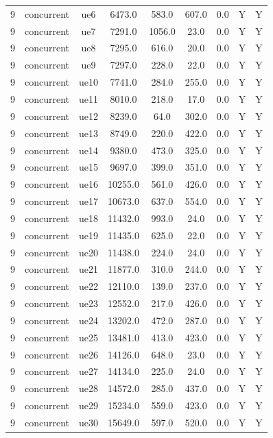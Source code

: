 \begin{table}[ht]
\begin{tabular}{|c|c|c|c|c|c|c|c|c|}
9 & concurrent & ue6 & 6473.0 & 583.0 & 607.0 & 0.0 & Y & Y \\
9 & concurrent & ue7 & 7291.0 & 1056.0 & 23.0 & 0.0 & Y & Y \\
9 & concurrent & ue8 & 7295.0 & 616.0 & 20.0 & 0.0 & Y & Y \\
9 & concurrent & ue9 & 7297.0 & 228.0 & 22.0 & 0.0 & Y & Y \\
9 & concurrent & ue10 & 7741.0 & 284.0 & 255.0 & 0.0 & Y & Y \\
9 & concurrent & ue11 & 8010.0 & 218.0 & 17.0 & 0.0 & Y & Y \\
9 & concurrent & ue12 & 8239.0 & 64.0 & 302.0 & 0.0 & Y & Y \\
9 & concurrent & ue13 & 8749.0 & 220.0 & 422.0 & 0.0 & Y & Y \\
9 & concurrent & ue14 & 9380.0 & 473.0 & 325.0 & 0.0 & Y & Y \\
9 & concurrent & ue15 & 9697.0 & 399.0 & 351.0 & 0.0 & Y & Y \\
9 & concurrent & ue16 & 10255.0 & 561.0 & 426.0 & 0.0 & Y & Y \\
9 & concurrent & ue17 & 10673.0 & 637.0 & 554.0 & 0.0 & Y & Y \\
9 & concurrent & ue18 & 11432.0 & 993.0 & 24.0 & 0.0 & Y & Y \\
9 & concurrent & ue19 & 11435.0 & 625.0 & 22.0 & 0.0 & Y & Y \\
9 & concurrent & ue20 & 11438.0 & 224.0 & 24.0 & 0.0 & Y & Y \\
9 & concurrent & ue21 & 11877.0 & 310.0 & 244.0 & 0.0 & Y & Y \\
9 & concurrent & ue22 & 12110.0 & 139.0 & 237.0 & 0.0 & Y & Y \\
9 & concurrent & ue23 & 12552.0 & 217.0 & 426.0 & 0.0 & Y & Y \\
9 & concurrent & ue24 & 13202.0 & 472.0 & 287.0 & 0.0 & Y & Y \\
9 & concurrent & ue25 & 13481.0 & 413.0 & 423.0 & 0.0 & Y & Y \\
9 & concurrent & ue26 & 14126.0 & 648.0 & 23.0 & 0.0 & Y & Y \\
9 & concurrent & ue27 & 14134.0 & 225.0 & 24.0 & 0.0 & Y & Y \\
9 & concurrent & ue28 & 14572.0 & 285.0 & 437.0 & 0.0 & Y & Y \\
9 & concurrent & ue29 & 15234.0 & 559.0 & 423.0 & 0.0 & Y & Y \\
9 & concurrent & ue30 & 15649.0 & 597.0 & 520.0 & 0.0 & Y & Y \\

\end{tabular}
\end{table}
